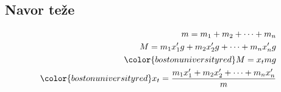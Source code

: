 {\color{indiagreen}\subsection{Navor teže}}
\begin{align*}
	m = m_1 + m_2 + \dots + m_n\\
	M = m_1x_1'g + m_2x_2'g + \dots + m_nx_n'g\\
	{\color{bostonuniversityred}M = x_tmg}\\
	{\color{bostonuniversityred}x_t = \frac{m_1x_1' + m_2x_2' + \dots + m_nx_n'}{m}}\\ 
\end{align*}